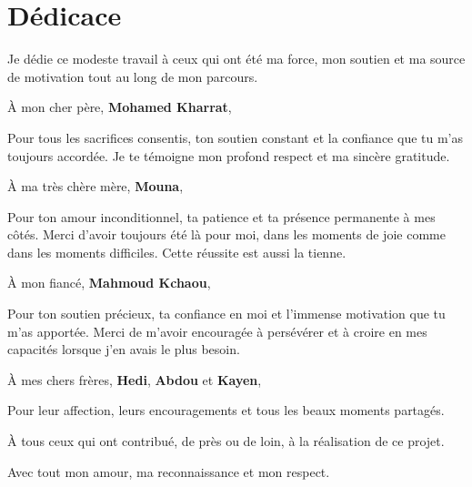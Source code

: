 \newpage
\thispagestyle{empty}
\section*{Dédicace}

\vspace{1cm}

\begin{center}

Je dédie ce modeste travail à ceux qui ont été ma force, mon soutien et ma source de motivation tout au long de mon parcours.

À mon cher père, \textbf{Mohamed Kharrat},

Pour tous les sacrifices consentis, ton soutien constant et la confiance que tu m'as toujours accordée. Je te témoigne mon profond respect et ma sincère gratitude.

À ma très chère mère, \textbf{Mouna},

Pour ton amour inconditionnel, ta patience et ta présence permanente à mes côtés. Merci d'avoir toujours été là pour moi, dans les moments de joie comme dans les moments difficiles. Cette réussite est aussi la tienne.

À mon fiancé, \textbf{Mahmoud Kchaou},

Pour ton soutien précieux, ta confiance en moi et l'immense motivation que tu m'as apportée. Merci de m'avoir encouragée à persévérer et à croire en mes capacités lorsque j'en avais le plus besoin.

À mes chers frères, \textbf{Hedi}, \textbf{Abdou} et \textbf{Kayen},

Pour leur affection, leurs encouragements et tous les beaux moments partagés.

À tous ceux qui ont contribué, de près ou de loin, à la réalisation de ce projet.

Avec tout mon amour, ma reconnaissance et mon respect.

\end{center}
